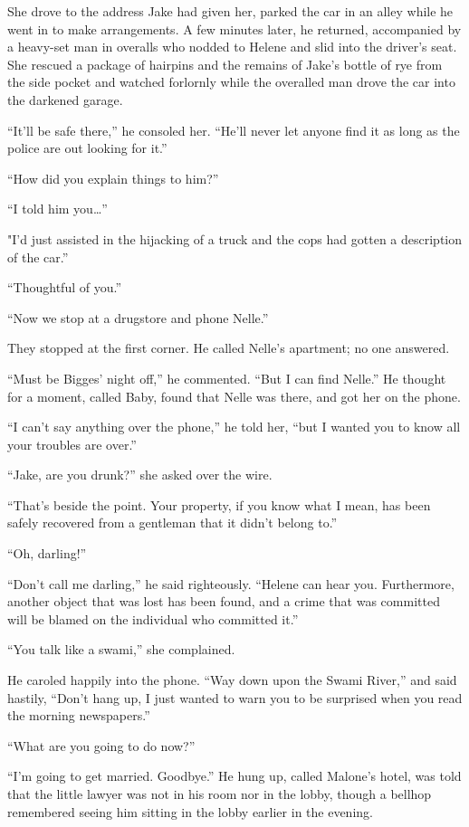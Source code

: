 \documentclass{novel}
\begin{document}
She drove to the address Jake had given her, parked the car in an alley while he went in to make arrangements. A few minutes later, he returned, accompanied by a heavy-set man in overalls who nodded to Helene and slid into the driver’s seat. She rescued a package of hairpins and the remains of Jake’s bottle of rye from the side pocket and watched forlornly while the overalled man drove the car into the darkened garage.

“It’ll be safe there,” he consoled her. “He’ll never let anyone find it as long as the police are out looking for it.”

“How did you explain things to him?”

“I told him you…”

"I'd just assisted in the hijacking of a truck and the cops had gotten a description of the car.”

“Thoughtful of you.”

“Now we stop at a drugstore and phone Nelle.”

They stopped at the first corner. He called Nelle’s apartment; no one answered.

“Must be Bigges’ night off,” he commented. “But I can find Nelle.” He thought for a moment, called Baby, found that Nelle was there, and got her on the phone.

“I can’t say anything over the phone,” he told her, “but I wanted you to know all your troubles are over.”

“Jake, are you drunk?” she asked over the wire.

“That’s beside the point. Your property, if you know what I mean, has been safely recovered from a gentleman that it didn’t belong to.”

“Oh, darling!”

“Don’t call me darling,” he said righteously. “Helene can hear you. Furthermore, another object that was lost has been found, and a crime that was committed will be blamed on the individual who committed it.”

“You talk like a swami,” she complained.

He caroled happily into the phone. “Way down upon the Swami River,” and said hastily, “Don’t hang up, I just wanted to warn you to be surprised when you read the morning newspapers.”

“What are you going to do now?”

“I’m going to get married. Goodbye.” He hung up, called Malone’s hotel, was told that the little lawyer was not in his room nor in the lobby, though a bellhop remembered seeing him sitting in the lobby earlier in the evening.
\end{document}
